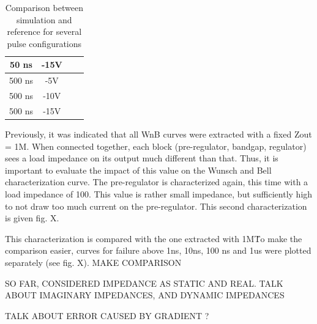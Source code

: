 \begin{table}[!htbp]
\begin{tabular}{@{}|c|c|c|c|@{}}
50 ns                                   & -15V                                    &                &             \\ \midrule
500 ns                                  & -5V                                     &                &             \\ \midrule
500 ns                                  & -10V                                    &                &             \\ \midrule
500 ns                                  & -15V                                    &                &             \\ \bottomrule
\end{tabular}
\caption{Comparison between simulation and reference for several pulse configurations}
\label{tab:comparison-multiple-pulses}
\end{table}


Previously, it was indicated that all WnB curves were extracted with a fixed Zout = 1M\textOmega.
When connected together, each block (pre-regulator, bandgap, regulator) sees a load impedance on its output much different than that.
Thus, it is important to evaluate the impact of this value on the Wunsch and Bell characterization curve.
The pre-regulator is characterized again, this time with a load impedance of 100\textOmega.
This value is rather small impedance, but sufficiently high to not draw too much current on the pre-regulator.
This second characterization is given fig. X.


This characterization is compared with the one extracted with 1M\textOmega\.
To make the comparison easier, curves for failure above 1ns, 10ns, 100 ns and 1us were plotted separately (see fig. X).
MAKE COMPARISON


SO FAR, CONSIDERED IMPEDANCE AS STATIC AND REAL.
TALK ABOUT IMAGINARY IMPEDANCES, AND DYNAMIC IMPEDANCES

TALK ABOUT ERROR CAUSED BY GRADIENT ?
